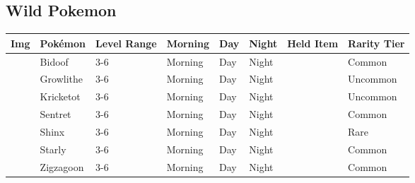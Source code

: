 \subsection{Wild Pokemon}%
\label{subsec:WildPokemon}%
\begin{longtable}{||l l l l l l l l||}%
\hline%
Img&Pokémon&Level Range&Morning&Day&Night&Held Item&Rarity Tier\\%
\hline%
\endhead%
\hline%
&Bidoof&3{-}6&Morning&Day&Night&&Common\\%
\hline%
&Growlithe&3{-}6&Morning&Day&Night&&Uncommon\\%
\hline%
&Kricketot&3{-}6&Morning&Day&Night&&Uncommon\\%
\hline%
&Sentret&3{-}6&Morning&Day&Night&&Common\\%
\hline%
&Shinx&3{-}6&Morning&Day&Night&&Rare\\%
\hline%
&Starly&3{-}6&Morning&Day&Night&&Common\\%
\hline%
&Zigzagoon&3{-}6&Morning&Day&Night&&Common\\%
\hline%
\end{longtable}